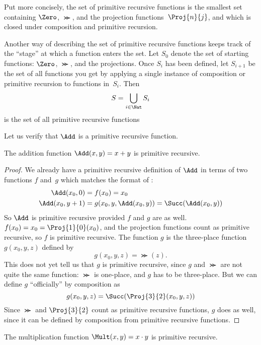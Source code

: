\documentclass[../../../include/open-logic-section]{subfiles}
\begin{document}
\begin{explain}
Put more concisely, the set of primitive recursive functions is the
smallest set containing $\Zero$, $\Succ$, and the projection
functions~$\Proj{n}{j}$, and which is closed under composition and
primitive recursion.

Another way of describing the set of primitive recursive functions
keeps track of the ``stage'' at which a function enters the set. Let
$S_0$ denote the set of starting functions: $\Zero$, $\Succ$, and the
projections. Once $S_i$ has been defined, let $S_{i+1}$ be the set of
all functions you get by applying a single instance of composition or
primitive recursion to functions in~$S_i$. Then
\[
S = \bigcup_{i \in \Nat} S_i
\]
is the set of all primitive recursive functions
\end{explain}

Let us verify that $\Add$ is a primitive recursive function.

\begin{prop}
  The addition function $\Add(x,y) = x+y$ is primitive recursive.
\end{prop}

\begin{proof}
We already have a primitive recursive definition of $\Add$ in terms of
two functions $f$ and~$g$ which matches the format of
:
\begin{align*}
  \Add(x_0, 0) & = f(x_0) = x_0\\
  \Add(x_0, y+1) & = g(x_0, y, \Add(x_0, y)) =
  \Succ(\Add(x_0, y))
\end{align*}
So $\Add$ is primitive recursive provided $f$ and $g$ are as
well. $f(x_0) = x_0 = \Proj{1}{0}(x_0)$, and the projection functions
count as primitive recursive, so $f$ is primitive recursive. The
function $g$ is the three-place function $g(x_0, y, z)$ defined by
\[
g(x_0, y, z) = \Succ(z).
\]
This does not yet tell us that $g$ is primitive recursive, since $g$
and $\Succ$ are not quite the same function: $\Succ$ is one-place, and
$g$ has to be three-place. But we can define $g$ ``officially'' by
composition as
\[
g(x_0, y, z) = \Succ(\Proj{3}{2}(x_0, y, z))
\]
Since $\Succ$ and $\Proj{3}{2}$ count as primitive recursive
functions, $g$ does as well, since it can be defined by composition
from primitive recursive functions.
\end{proof}

\begin{prop}
  The multiplication function $\Mult(x,y) = x \cdot y$ is primitive recursive.
\end{prop}
\end{document}
